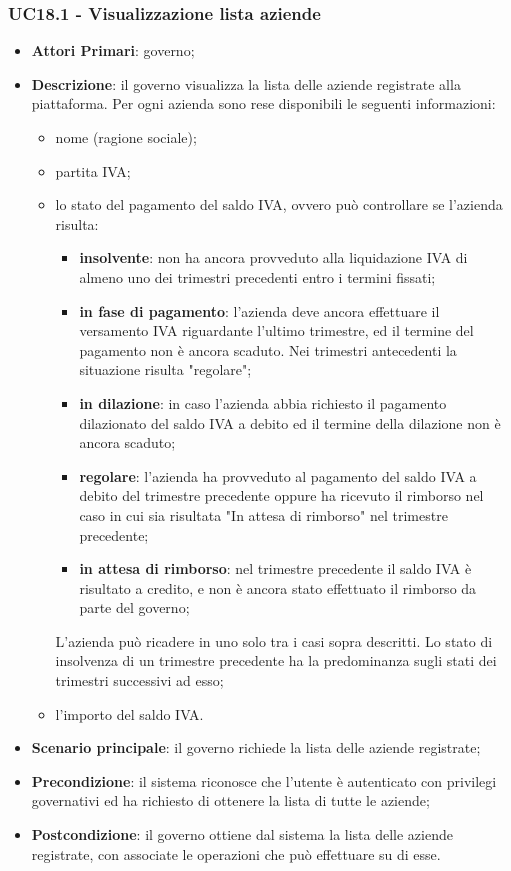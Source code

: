 \subsubsection{UC18.1 - Visualizzazione lista aziende}

 \begin{itemize}
	\item \textbf{Attori Primari}: governo;
	\item \textbf{Descrizione}: il governo visualizza la lista delle aziende registrate alla piattaforma. Per ogni azienda sono rese disponibili le seguenti informazioni:
	\begin{itemize}
		\item nome (ragione sociale);
		\item partita IVA;
		\item lo stato del pagamento del saldo IVA, ovvero può controllare se l'azienda risulta:
		\begin{itemize}
			\item \textbf{insolvente}: non ha ancora provveduto alla liquidazione IVA di almeno uno dei trimestri precedenti entro i termini fissati;
			\item \textbf{in fase di pagamento}: l'azienda deve ancora effettuare il versamento IVA riguardante l'ultimo trimestre, ed il termine del pagamento non è ancora scaduto. Nei trimestri antecedenti la situazione risulta "regolare";
			\item \textbf{in dilazione}: in caso l'azienda abbia richiesto il pagamento dilazionato del saldo IVA a debito ed il termine della dilazione non è ancora scaduto;
			\item \textbf{regolare}: l'azienda ha provveduto al pagamento del saldo IVA a debito del trimestre precedente oppure ha ricevuto il rimborso nel caso in cui sia risultata "In attesa di rimborso" nel trimestre precedente;
			\item \textbf{in attesa di rimborso}: nel trimestre precedente il saldo IVA è risultato a credito, e non è ancora stato effettuato il rimborso da parte del governo;
		\end{itemize}
	L'azienda può ricadere in uno solo tra i casi sopra descritti. Lo stato di insolvenza di un trimestre precedente ha la predominanza sugli stati dei trimestri successivi ad esso;
		\item l'importo del saldo IVA.
	\end{itemize}
	
	\item \textbf{Scenario principale}: il governo richiede la lista delle aziende registrate;
	\item \textbf{Precondizione}: il sistema riconosce che l'utente è autenticato con privilegi governativi ed ha richiesto di ottenere la lista di tutte le aziende;
	\item \textbf{Postcondizione}: il governo ottiene dal sistema la lista delle aziende registrate, con associate le operazioni che può effettuare su di esse.
\end{itemize}

